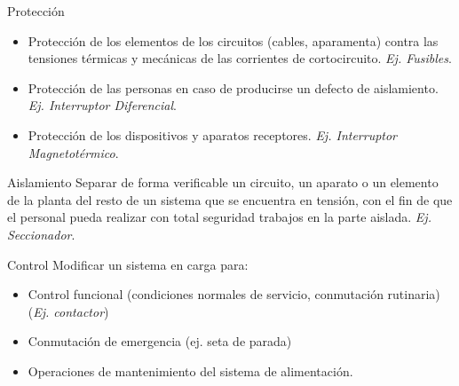 \documentclass[xcolor={usenames,svgnames,dvipsnames}]{beamer}
\begin{document}
\begin{frame}[label={sec:org610c3c5}]{Protección}
\begin{itemize}
\item Protección de los \alert{elementos de los circuitos} (cables,
aparamenta) contra las tensiones térmicas y mecánicas de las
corrientes de cortocircuito. \emph{Ej. Fusibles}.

\item Protección de las \alert{personas} en caso de producirse un defecto de aislamiento. \emph{Ej. Interruptor Diferencial}.

\item Protección de los \alert{dispositivos y aparatos receptores}. \emph{Ej. Interruptor Magnetotérmico}.
\end{itemize}
\end{frame}

\begin{frame}[label={sec:org0bd8e96}]{Aislamiento}
Separar de forma verificable un circuito, un aparato o un elemento de la planta del resto de un sistema que se encuentra en tensión, con el fin de que el personal pueda realizar con total seguridad trabajos en la parte aislada. 
\emph{Ej. Seccionador}.
\end{frame}

\begin{frame}[label={sec:org81dc8e4}]{Control}
Modificar un sistema en carga para:

\begin{itemize}
\item Control funcional (condiciones normales de servicio, conmutación rutinaria) (\emph{Ej. contactor})

\item Conmutación de emergencia (ej. seta de parada)

\item Operaciones de mantenimiento del sistema de alimentación.
\end{itemize}
\end{frame}
\end{document}
